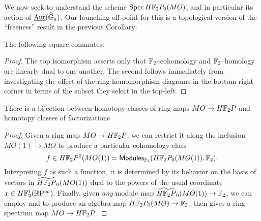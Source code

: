 We now seek to understand the scheme $\operatorname{Spec} H\mathbb F_2P_0(MO)$, and in particular its action of $\operatorname{\underline{\smash{\operatorname{Aut}}}}(\widehat{\mathbb G}_a)$.  Our launching-off point for this is a topological version of the ``freeness'' result in the previous Corollary:
\begin{lemma}\label{DetectingMORingMapsInHomotopy}
The following square commutes:
\begin{center}
\end{center}
\end{lemma}
\begin{proof}
The top isomorphism asserts only that $\mathbb F_2$--cohomology and $\mathbb F_2$--homology are linearly dual to one another.  The second follows immediately from investigating the effect of the ring homomorphism diagrams in the bottom-right corner in terms of the subset they select in the top-left.
\end{proof}

\begin{corollary}
There is a bijection between homotopy classes of ring maps $MO \to H\mathbb F_2P$ and homotopy classes of factorizations
\begin{center}
\end{center}
\end{corollary}
\begin{proof}
Given a ring map $MO \to H\mathbb F_2P$, we can restrict it along the inclusion $MO(1) \to MO$ to produce a particular cohomology class \[f \in H\mathbb F_2P^0(MO(1)) = \mathsf{Modules}_{\mathbb F_2}(H\mathbb F_2P_0(MO(1)), \mathbb F_2).\]  Interpreting $f$ as such a function, it is determined by its behavior on the basis of vectors in $\widetilde{H\mathbb F_2P}_0(MO(1))$ dual to the powers of the usual coordinate $x \in H\mathbb F_2^1(\mathbb R\mathrm P^\infty)$.   Finally, given \emph{any} module map $\widetilde{H\mathbb F_2P}_0(MO(1)) \to \mathbb F_2$, we can employ  and to produce an algebra map $H\mathbb F_2P_0(MO) \to \mathbb F_2$.  then gives a ring spectrum map $MO \to H\mathbb F_2P$.
\end{proof}

